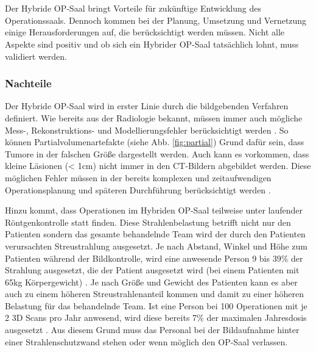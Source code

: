 \chapter{}
\label{sec:overview}

Der Hybride OP-Saal bringt Vorteile für zukünftige Entwicklung des Operationssaals. Dennoch kommen bei der Planung, Umsetzung und Vernetzung einige Herausforderungen auf, die berücksichtigt werden müssen. 
Nicht alle Aspekte sind positiv und ob sich ein Hybrider OP-Saal tatsächlich lohnt, muss validiert werden.

\subsection{Nachteile}

Der Hybride OP-Saal wird in erster Linie durch die bildgebenden Verfahren definiert. Wie bereits aus der Radiologie bekannt, müssen immer auch mögliche \glqq Mess-, Rekonstruktions- und Modellierungsfehler berücksichtigt werden\grqq{} \cite{DerDigitaleOperationssaal}. 
So können Partialvolumenartefakte (siehe Abb. \ref{fig:partial}) Grund dafür sein, dass Tumore in der falschen Größe dargestellt werden. Auch kann es vorkommen, dass kleine Läsionen (< 1cm) nicht immer in den CT-Bildern abgebildet werden. Diese möglichen Fehler müssen in der bereits komplexen und zeitaufwendigen Operationsplanung und späteren Durchführung berücksichtigt werden \cite{DerDigitaleOperationssaal}.

Hinzu kommt, dass Operationen im Hybriden OP-Saal teilweise unter laufender Röntgenkontrolle statt finden. Diese Strahlenbelastung betrifft nicht nur den Patienten sondern das gesamte behandelnde Team wird der durch den Patienten verursachten Streustrahlung ausgesetzt. Je nach Abstand, Winkel und Höhe zum Patienten während der Bildkontrolle, wird eine anwesende Person 9 bis 39\% der Strahlung ausgesetzt, die der Patient ausgesetzt wird (bei einem Patienten mit 65kg Körpergewicht) \cite{RadiationExposure}. Je nach Größe und Gewicht des Patienten kann es aber auch zu einem höheren Streustrahlenanteil kommen und damit zu einer höheren Belastung für das behandelnde Team. Ist eine Person bei 100 Operationen mit je 2 3D Scans pro Jahr anwesend, wird diese bereits 7\% der maximalen Jahresdosis ausgesetzt \cite{RadiationExposure}. Aus diesem Grund muss das Personal bei der Bildaufnahme hinter einer Strahlenschutzwand stehen oder wenn möglich den OP-Saal verlassen.

